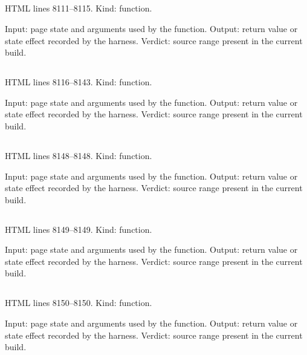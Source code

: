 \subsection*{\texttt{}}
\label{vf_432_roleFromName}
HTML lines 8111--8115. Kind: function.

Input: page state and arguments used by the function.
Output: return value or state effect recorded by the harness.
Verdict: source range present in the current build.

\subsection*{\texttt{}}
\label{vf_433_assignRoles}
HTML lines 8116--8143. Kind: function.

Input: page state and arguments used by the function.
Output: return value or state effect recorded by the harness.
Verdict: source range present in the current build.

\subsection*{\texttt{}}
\label{vf_434_operatorOf}
HTML lines 8148--8148. Kind: function.

Input: page state and arguments used by the function.
Output: return value or state effect recorded by the harness.
Verdict: source range present in the current build.

\subsection*{\texttt{}}
\label{vf_435_sourceUidOf}
HTML lines 8149--8149. Kind: function.

Input: page state and arguments used by the function.
Output: return value or state effect recorded by the harness.
Verdict: source range present in the current build.

\subsection*{\texttt{}}
\label{vf_436_sourceCRCOf}
HTML lines 8150--8150. Kind: function.

Input: page state and arguments used by the function.
Output: return value or state effect recorded by the harness.
Verdict: source range present in the current build.

